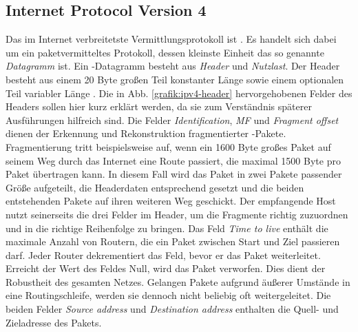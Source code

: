 \subsection{Internet Protocol Version 4}
Das im Internet verbreitetste Vermittlungsprotokoll ist . Es handelt sich dabei um ein paketvermitteltes Protokoll, dessen kleinste Einheit das so genannte \textit{Datagramm} ist. Ein -Datagramm besteht aus \textit{Header} und \textit{Nutzlast}. Der Header besteht aus einem 20 Byte großen Teil konstanter Länge sowie einem optionalen Teil variabler Länge \autocite[439]{Tanenbaum2010}. Die in Abb. \ref{grafik:ipv4-header} hervorgehobenen Felder des Headers sollen hier kurz erklärt werden, da sie zum Verständnis späterer Ausführungen hilfreich sind.
Die Felder \textit{Identification}, \textit{MF} und \textit{Fragment offset} dienen der Erkennung und Rekonstruktion fragmentierter -Pakete. Fragmentierung tritt beispielsweise auf, wenn ein 1600 Byte großes Paket auf seinem Weg durch das Internet eine Route passiert, die maximal 1500 Byte pro Paket übertragen kann. In diesem Fall wird das Paket in zwei Pakete passender Größe aufgeteilt, die Headerdaten entsprechend gesetzt und die beiden entstehenden Pakete auf ihren weiteren Weg geschickt. Der empfangende Host nutzt seinerseits die drei Felder im Header, um die Fragmente richtig zuzuordnen und in die richtige Reihenfolge zu bringen. Das Feld \textit{Time to live} enthält die maximale Anzahl von Routern, die ein Paket zwischen Start und Ziel passieren darf. Jeder Router dekrementiert das Feld, bevor er das Paket weiterleitet. Erreicht der Wert des Feldes Null, wird das Paket verworfen. Dies dient der Robustheit des gesamten Netzes. Gelangen Pakete aufgrund äußerer Umstände in eine Routingschleife, werden sie dennoch nicht beliebig oft weitergeleitet. Die beiden Felder \textit{Source address} und \textit{Destination address} enthalten die Quell- und Zieladresse des Pakets.
